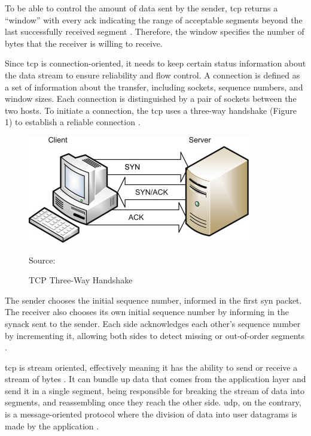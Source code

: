 To be able to control the amount of data sent by the sender, \gls{tcp} returns a “window” with every \gls{ack} indicating the range of acceptable segments beyond the last successfully received segment \cite{rfc793}. Therefore, the window specifies the number of bytes that the receiver is willing to receive.

Since \gls{tcp} is connection-oriented, it needs to keep certain status information about the data stream to ensure reliability and flow control. A connection is defined as a set of information about the transfer, including sockets, sequence numbers, and window sizes. Each connection is distinguished by a pair of sockets between the two hosts. To initiate a connection, the  \gls{tcp} uses a three-way handshake (Figure 1) to establish a reliable connection \cite{telecom_network_security}.

\begin{figure}[ht]
    \centering
    \includegraphics[width=\linewidth]{figures/3-s2.0-B9780128024379000059-f05-08-9780128024379.jpg}
    \caption{TCP Three-Way Handshake}
    {Source: \cite{telecom_network_security}}
    \label{figure:tcp_handshake}
\end{figure}

The sender chooses the initial sequence number, informed in the first \gls{syn} packet. The receiver also chooses its own initial sequence number by informing in the \gls{synack} sent to the sender. Each side acknowledges each other’s sequence number by incrementing it, allowing both sides to detect missing or out-of-order segments \cite{telecom_network_security}.

\gls{tcp} is stream oriented, effectively meaning it has the ability to send or receive a stream of bytes \cite{rfc793}. It can bundle up data that comes from the application layer and send it in a single segment, being responsible for breaking the stream of data into segments, and reassembling once they reach the other side. \gls{udp}, on the contrary, is a message-oriented protocol where the division of data into user datagrams is made by the application \cite{data_networks_ip}.

